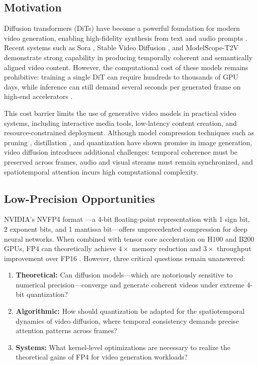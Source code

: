\documentclass[journal,twoside]{IEEEtran}
\theoremstyle{definition}
\theoremstyle{remark}
\begin{document}
\subsection{Motivation}
Diffusion transformers (DiTs) \cite{peebles2023scalable} have become a powerful foundation for modern video generation, enabling high-fidelity synthesis from text and audio prompts \cite{ho2022imagen, singer2023make, rombach2022high}. Recent systems such as Sora \cite{openai2024sora}, Stable Video Diffusion \cite{stability2023svd}, and ModelScope-T2V \cite{wang2023modelscope} demonstrate strong capability in producing temporally coherent and semantically aligned video content. However, the computational cost of these models remains prohibitive: training a single DiT can require hundreds to thousands of GPU days, while inference can still demand several seconds per generated frame on high-end accelerators \cite{xing2024vidsurvey, openai2024sora}.

This cost barrier limits the use of generative video models in practical video systems, including interactive media tools, low-latency content creation, and resource-constrained deployment. Although model compression techniques such as pruning \cite{han2016deep}, distillation \cite{hinton2014distilling}, and quantization \cite{jacob2018quantization} have shown promise in image generation, video diffusion introduces additional challenges: temporal coherence must be preserved across frames, audio and visual streams must remain synchronized, and spatiotemporal attention incurs high computational complexity.

\subsection{Low-Precision Opportunities}
NVIDIA's NVFP4 format \cite{nvidia2024nvfp4}---a 4-bit floating-point representation with 1 sign bit, 2 exponent bits, and 1 mantissa bit---offers unprecedented compression for deep neural networks. When combined with tensor core acceleration on H100 and B200 GPUs, FP4 can theoretically achieve $4\times$ memory reduction and $3\times$ throughput improvement over FP16 \cite{nvidia2022h100}. However, three critical questions remain unanswered:

\begin{enumerate}
    \item \textbf{Theoretical:} Can diffusion models---which are notoriously sensitive to numerical precision---converge and generate coherent videos under extreme 4-bit quantization?
    \item \textbf{Algorithmic:} How should quantization be adapted for the spatiotemporal dynamics of video diffusion, where temporal consistency demands precise attention patterns across frames?
    \item \textbf{Systems:} What kernel-level optimizations are necessary to realize the theoretical gains of FP4 for video generation workloads?
\end{enumerate}
\end{document}
